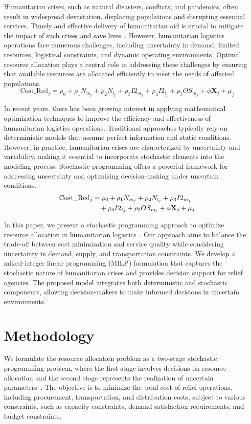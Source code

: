 \documentclass[trsc,dblanonrev]{informs4}
\begin{document}
Humanitarian crises, such as natural disasters, conflicts, and pandemics, often result in widespread devastation, displacing populations and disrupting essential services. Timely and effective delivery of humanitarian aid is crucial to mitigate the impact of such crises and save lives~\cite{smith2005}. However, humanitarian logistics operations face numerous challenges, including uncertainty in demand, limited resources, logistical constraints, and dynamic operating environments. Optimal resource allocation plays a central role in addressing these challenges by ensuring that available resources are allocated efficiently to meet the needs of affected populations.
\begin{equation}
\mathrm{Cost\_Red}_j=\rho_0+\rho_1N_{m_j}+\rho_2N_{l_j}+\rho_3I2_{m_j}+\rho_4I2_{l_j}+\rho_5OS_{m_j}+\phi\mathbf{X}_j+\mu_j
\end{equation}

In recent years, there has been growing interest in applying mathematical optimization techniques to improve the efficiency and effectiveness of humanitarian logistics operations. Traditional approaches typically rely on deterministic models that assume perfect information and static conditions. However, in practice, humanitarian crises are characterized by uncertainty and variability, making it essential to incorporate stochastic elements into the modeling process. Stochastic programming offers a powerful framework for addressing uncertainty and optimizing decision-making under uncertain conditions.
\begin{align}
\mbox{Cost\_Red}_j&=\rho_0+\rho_1N_{m_j}+\rho_2N_{l_j}+\rho_3I2_{m_j}\notag\\
&\quad+\rho_4I2_{l_j}+\rho_5OS_{m_j}+\phi\mathbf{X}_j+\mu_j
\end{align}

In this paper, we present a stochastic programming approach to optimize resource allocation in humanitarian logistics~\citep{jones2010}. Our approach aims to balance the trade-off between cost minimization and service quality while considering uncertainty in demand, supply, and transportation constraints. We develop a mixed-integer linear programming (MILP) formulation that captures the stochastic nature of humanitarian crises and provides decision support for relief agencies. The proposed model integrates both deterministic and stochastic components, allowing decision-makers to make informed decisions in uncertain environments.

\section{Methodology}\label{sec:Method}
We formulate the resource allocation problem as a two-stage stochastic programming problem, where the first stage involves decisions on resource allocation and the second stage represents the realization of uncertain parameters~\citep{smith2005,jones2010,brown2015}. The objective is to minimize the total cost of relief operations, including procurement, transportation, and distribution costs, subject to various constraints, such as capacity constraints, demand satisfaction requirements, and budget constraints.
\end{document}
